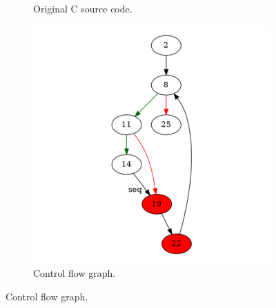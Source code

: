 \begin{figure}[htbp]
	\centering
	\begin{subfigure}[b]{0.48\textwidth}
		\centering
		
		\caption{Original C source code.}
	\end{subfigure}
	\begin{subfigure}[b]{0.50\textwidth}
		\centering
		\includegraphics[width=\textwidth]{inc/appendices/examples/hammock/example/without-break/main_0001a.png}
		\caption{Control flow graph.}
	\end{subfigure}
\end{figure}


